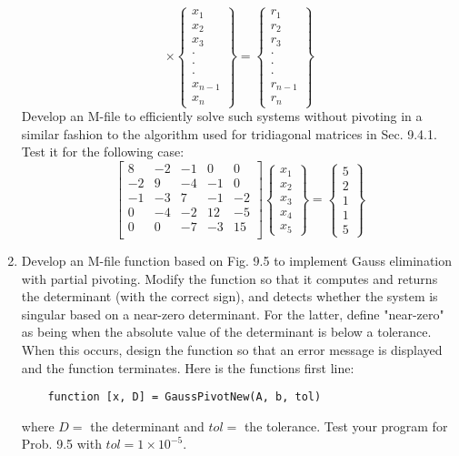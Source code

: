 \documentclass[../main.tex]{subfiles}
\begin{document}
\begin{multicols}{2}
\begin{enumerate}
\[\times \begin{Bmatrix}
x_{1}\\
x_{2}\\
x_{3}\\
\cdot\\
\cdot\\
\cdot\\
x_{n-1}\\
x_{n}
\end{Bmatrix} = \begin{Bmatrix}
r_{1}\\
r_{2}\\
r_{3}\\
\cdot\\
\cdot\\
\cdot\\
r_{n-1}\\
r_{n}
\end{Bmatrix}\]
Develop an M-file to efficiently solve such systems without
pivoting in a similar fashion to the algorithm used for tridiagonal matrices in Sec. 9.4.1. Test it for the following case:
\[\begin{bmatrix}
8 	& -2	& -1	& 0		& 0		\\
-2	& 9 	& -4	& -1	& 0		\\
-1 	& -3	& 7 	& -1	& -2	\\
0 	& -4	& -2 	& 12	& -5	\\
0 	& 0		& -7 	& -3	& 15	\\
\end{bmatrix} \begin{Bmatrix}
x_{1}\\
x_{2}\\
x_{3}\\
x_{4}\\
x_{5}
\end{Bmatrix} = \begin{Bmatrix}
5\\
2\\
1\\
1\\
5
\end{Bmatrix}\]
	\item Develop an M-file function based on Fig. 9.5 to implement Gauss elimination with partial pivoting. Modify the function so that it computes and returns the determinant (with the correct sign), and detects whether the system is singular based on a near-zero determinant. For the latter, define "near-zero" as being when the absolute value of the determinant is below a tolerance. When this occurs, design the function so that an error message is displayed and the function terminates. Here is the functions first line:
	\begin{verbatim}
	function [x, D] = GaussPivotNew(A, b, tol)
	\end{verbatim}
	where $D =$ the determinant and $tol =$ the tolerance. Test your program for Prob. 9.5 with $tol = 1 \times 10^{-5}$.
	\end{enumerate}

\end{multicols}
\end{document}
